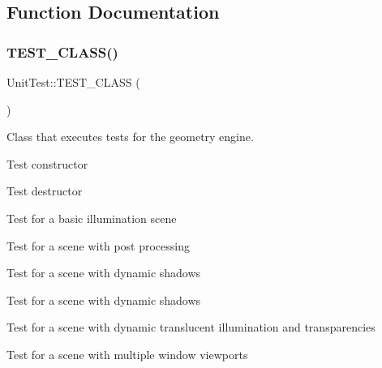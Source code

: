 \subsection{Function Documentation}
\mbox{\label{namespace_unit_test_aa27c1a34f019a757474599d420492bf6}} 
\subsubsection{\texorpdfstring{TEST\_CLASS()}{TEST\_CLASS()}}
{\footnotesize\ttfamily Unit\+Test\+::\+T\+E\+S\+T\+\_\+\+C\+L\+A\+SS (\begin{DoxyParamCaption}\item[{Geometry\+Engine\+Tests}]{ }\end{DoxyParamCaption})}



Class that executes tests for the geometry engine. 

Test constructor

Test destructor

Test for a basic illumination scene

Test for a scene with post processing

Test for a scene with dynamic shadows

Test for a scene with dynamic shadows

Test for a scene with dynamic translucent illumination and transparencies

Test for a scene with multiple window viewports 
